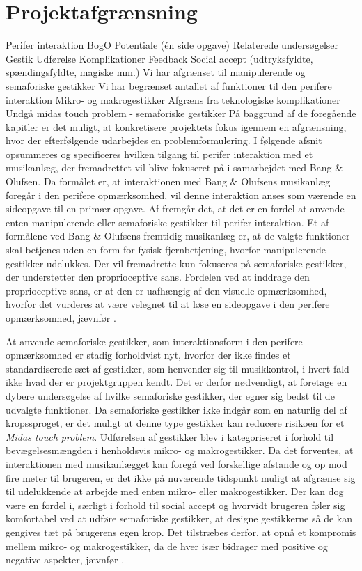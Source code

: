 \chapter{Projektafgrænsning}
\label{Afgraensning}
%
Perifer interaktion 
BogO
Potentiale (én side opgave)
Relaterede undersøgelser
Gestik
Udførelse
Komplikationer
Feedback
Social accept (udtryksfyldte, spændingsfyldte, magiske mm.)
Vi har afgrænset til manipulerende og semaforiske gestikker
Vi har begrænset antallet af funktioner til den perifere interaktion
Mikro- og makrogestikker 
Afgræns fra teknologiske komplikationer
Undgå midas touch problem - semaforiske gestikker 
%
På baggrund af de foregående kapitler er det muligt, at konkretisere projektets fokus igennem en afgrænsning, hvor der efterfølgende udarbejdes en problemformulering. I følgende afsnit opsummeres og specificeres hvilken tilgang til perifer interaktion med et musikanlæg, der fremadrettet vil blive fokuseret på i samarbejdet med Bang $\&$ Olufsen.\blankline
%
Da formålet er, at interaktionen med Bang $\&$ Olufsens musikanlæg foregår i den perifere opmærksomhed, vil denne interaktion anses som værende en sideopgave til en primær opgave. Af  fremgår det, at det er en fordel at anvende enten manipulerende eller semaforiske gestikker til perifer interaktion. Et af formålene ved Bang $\&$ Olufsens fremtidig musikanlæg er, at de valgte funktioner skal betjenes uden en form for fysisk fjernbetjening, hvorfor manipulerende gestikker udelukkes. Der vil fremadrette kun fokuseres på semaforiske gestikker, der understøtter den proprioceptive sans. Fordelen ved at inddrage den proprioceptive sans, er at den er uafhængig af den visuelle opmærksomhed, hvorfor det vurderes at være velegnet til at løse en sideopgave i den perifere opmærksomhed, jævnfør .     

At anvende semaforiske gestikker, som interaktionsform i den perifere opmærksomhed er stadig forholdvist nyt, hvorfor der ikke findes et standardiserede sæt af gestikker, som henvender sig til musikkontrol, i hvert fald ikke hvad der er projektgruppen kendt. Det er derfor nødvendigt, at foretage en dybere undersøgelse af hvilke semaforiske gestikker, der egner sig bedst til de udvalgte funktioner. Da semaforiske gestikker ikke indgår som en naturlig del af kropssproget, er det muligt at denne type gestikker kan reducere risikoen for et \textit{Midas touch problem}.\blankline
%
Udførelsen af gestikker blev i  kategoriseret i forhold til bevægelsesmængden i henholdsvis mikro- og makrogestikker. Da det forventes, at interaktionen med musikanlægget kan foregå ved forskellige afstande og op mod fire meter til brugeren, er det ikke på nuværende tidspunkt muligt at afgrænse sig til udelukkende at arbejde med enten mikro- eller makrogestikker. Der kan dog være en fordel i, særligt i forhold til social accept og hvorvidt brugeren føler sig komfortabel ved at udføre semaforiske gestikker, at designe gestikkerne så de kan gengives tæt på brugerens egen krop. Det tilstræbes derfor, at opnå et kompromis mellem mikro- og makrogestikker, da de hver især bidrager med positive og negative aspekter, jævnfør .

